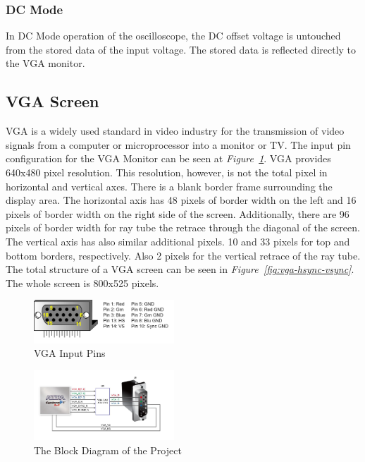 \documentclass[paper]{IEEEtran}
\begin{document}
	\subsubsection*{DC Mode} \- \indent
	In DC Mode operation of the oscilloscope, the DC offset voltage is untouched from the stored data of the input voltage. The stored data is reflected directly to the VGA monitor. 
	
	
	\subsection{VGA Screen} \- \indent
	VGA is a widely used standard in video industry for the transmission of video signals from a computer or microprocessor into a monitor or TV. The input pin configuration for the VGA Monitor can be seen at \textit{Figure~\ref{fig:vga_pins}}. VGA provides 640x480 pixel resolution. This resolution, however, is not the total pixel in horizontal and vertical axes. There is a blank border frame surrounding the display area. The horizontal axis has 48 pixels of border width on the left and 16 pixels of border width on the right side of the screen. Additionally, there are 96 pixels of border width for ray tube the retrace through the diagonal of the screen. The vertical axis has also similar additional pixels. 10 and 33 pixels for top and bottom borders, respectively. Also 2 pixels for the vertical retrace of the ray tube. The total structure of a VGA screen can be seen in \textit{Figure~\ref{fig:vga-hsync-vsync}}. The whole screen is 800x525 pixels.
	
	\begin{figure}[h!]
		\setlength{\unitlength}{\textwidth}
		\center 
		\includegraphics[width=0.47\textwidth]{vgapins}
		\caption{\label{fig:vga_pins} VGA Input Pins}
	\end{figure}
	
	
	\begin{figure}[h!]
		\setlength{\unitlength}{\textwidth}
		\center 
		\includegraphics[width=0.47\textwidth]{VGAconfig}
		\caption{\label{fig:VGA_config}The Block Diagram of the Project}
	\end{figure}
	
\end{document}
